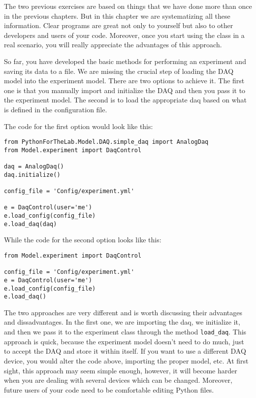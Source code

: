 {The two previous exercises are based on things that we have done more than once in the previous chapters. But in this chapter we are systematizing all these information. Clear programs are great not only to yourself but also to other developers and users of your code. Moreover, once you start using the class in a real scenario, you will really appreciate the advantages of this approach.


So far, you have developed the basic methods for performing an experiment and saving its data to a file. We are missing the crucial step of loading the {DAQ} model into the experiment model. There are two options to achieve it. The first one is that you manually import and initialize the {DAQ} and then you pass it to the experiment model. The second is to load the appropriate daq based on what is defined in the configuration file.

The code for the first option would look like this:

\begin{verbatim}
from PythonForTheLab.Model.DAQ.simple_daq import AnalogDaq
from Model.experiment import DaqControl

daq = AnalogDaq()
daq.initialize()

config_file = 'Config/experiment.yml'

e = DaqControl(user='me')
e.load_config(config_file)
e.load_daq(daq)
\end{verbatim}

While the code for the second option looks like this:

\begin{verbatim}
from Model.experiment import DaqControl

config_file = 'Config/experiment.yml'
e = DaqControl(user='me')
e.load_config(config_file)
e.load_daq()
\end{verbatim}

The two approaches are very different and is worth discussing their advantages and dissadvantages. In the first one, we are
importing the daq, we initialize it, and then we pass it to the experiment class through the method \texttt{load\_daq}. This approach is quick, because the experiment model doesn't need to do much, just to accept the DAQ and store it within itself. If you want to use a different DAQ device, you would alter the code above, importing the proper model, etc. At first sight, this approach may seem simple enough, however, it will become harder when you are dealing with several devices which can be changed. Moreover, future users of your code need to be comfortable editing Python files. 

}
